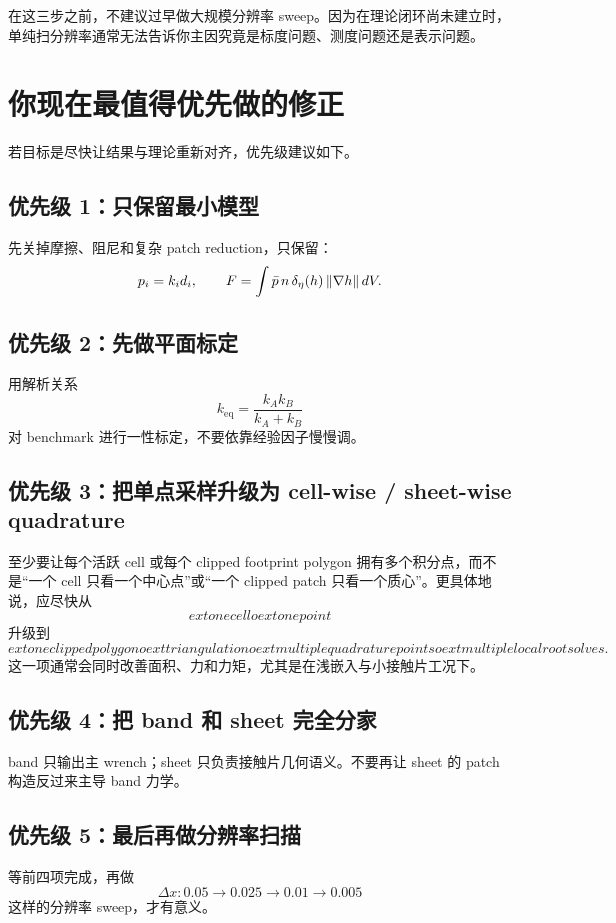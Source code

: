 \documentclass[12pt,a4paper]{ctexart}
\begin{document}
在这三步之前，不建议过早做大规模分辨率 sweep。因为在理论闭环尚未建立时，单纯扫分辨率通常无法告诉你主因究竟是标度问题、测度问题还是表示问题。

\section{你现在最值得优先做的修正}

若目标是尽快让结果与理论重新对齐，优先级建议如下。

\subsection{优先级 1：只保留最小模型}
先关掉摩擦、阻尼和复杂 patch reduction，只保留：
\begin{equation}
    p_i=k_i d_i,
    \qquad
    F = \int \bar p\,n\,\delta_\eta(h)\,\norm{\nabla h}\,dV.
\end{equation}

\subsection{优先级 2：先做平面标定}
用解析关系
\begin{equation}
    k_{\mathrm{eq}}=\frac{k_Ak_B}{k_A+k_B}
\end{equation}
对 benchmark 进行一性标定，不要依靠经验因子慢慢调。

\subsection{优先级 3：把单点采样升级为 cell-wise / sheet-wise quadrature}
至少要让每个活跃 cell 或每个 clipped footprint polygon 拥有多个积分点，而不是“一个 cell 只看一个中心点”或“一个 clipped patch 只看一个质心”。更具体地说，应尽快从
\[
	ext{one cell} 	o 	ext{one point}
\]
升级到
\[
	ext{one clipped polygon} 	o 	ext{triangulation} 	o 	ext{multiple quadrature points} 	o 	ext{multiple local root solves}.
\]
这一项通常会同时改善面积、力和力矩，尤其是在浅嵌入与小接触片工况下。

\subsection{优先级 4：把 band 和 sheet 完全分家}
band 只输出主 wrench；sheet 只负责接触片几何语义。不要再让 sheet 的 patch 构造反过来主导 band 力学。

\subsection{优先级 5：最后再做分辨率扫描}
等前四项完成，再做
\begin{equation}
    \Delta x: 0.05 \to 0.025 \to 0.01 \to 0.005
\end{equation}
这样的分辨率 sweep，才有意义。
\end{document}
